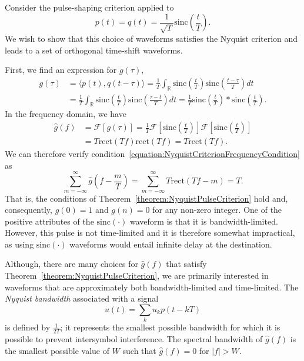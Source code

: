 \begin{example}
Consider the pulse-shaping criterion applied to
\begin{equation*}
p(t) = q(t) = \frac{1}{\sqrt{T}} \mathrm{sinc} \left( \frac{t}{T} \right) .
\end{equation*}
We wish to show that this choice of waveforms satisfies the Nyquist criterion and leads to a set of orthogonal time-shift waveforms.

First, we find an expression for $g(\tau)$,
\begin{equation*}
\begin{split}
g(\tau) &= \langle p(t), q(t-\tau) \rangle
= \frac{1}{T} \int_{\mathbb{R}} \mathrm{sinc} \left( \frac{t}{T} \right)
\mathrm{sinc} \left( \frac{t - \tau}{T} \right) dt \\
&= \frac{1}{T} \int_{\mathbb{R}} \mathrm{sinc} \left( \frac{t}{T} \right)
\mathrm{sinc} \left( \frac{\tau - t}{T} \right) dt
= \frac{1}{T} \mathrm{sinc} \left( \frac{t}{T} \right)
\ast \mathrm{sinc} \left( \frac{t}{T} \right) .
\end{split}
\end{equation*}
In the frequency domain, we have
\begin{equation*}
\begin{split}
\hat{g}(f) &= \mathcal{F} \left[ g(\tau) \right]
= \frac{1}{T} \mathcal{F} \left[ \mathrm{sinc} \left( \frac{t}{T} \right) \right]
\mathcal{F} \left[ \mathrm{sinc} \left( \frac{t}{T} \right) \right] \\
&= T \mathrm{rect} (T f) \mathrm{rect} (T f)
= T \mathrm{rect} (T f) .
\end{split}
\end{equation*}
We can therefore verify condition~\eqref{equation:NyquistCriterionFrequencyCondition} as
\begin{equation*}
\sum_{m = -\infty}^{\infty}
\hat{g} \left( f - \frac{m}{T} \right)
= \sum_{m = - \infty}^{\infty} T \mathrm{rect} (Tf - m)
= T .
\end{equation*}
That is, the conditions of Theorem~\ref{theorem:NyquistPulseCriterion} hold and, consequently, $g(0) = 1$ and $g(n) = 0$ for any non-zero integer.
One of the positive attributes of the $\mathrm{sinc} (\cdot)$ waveform is that it is bandwidth-limited.
However, this pulse is not time-limited and it is therefore somewhat impractical, as using $\mathrm{sinc} (\cdot)$ waveforms would entail infinite delay at the destination.
\end{example}

Although, there are many choices for $\hat{g}(f)$ that satisfy Theorem~\ref{theorem:NyquistPulseCriterion}, we are primarily interested in waveforms that are approximately both bandwidth-limited and time-limited.
The \emph{Nyquist bandwidth} associated with a signal
\begin{equation*}
u(t) = \sum_k u_k p(t -kT)
\end{equation*}
is defined by $\frac{1}{2T}$; it represents the smallest possible bandwidth for which it is possible to prevent intersymbol interference.
The spectral bandwidth of $\hat{g}(f)$ is the smallest possible value of $W$ such that $\hat{g}(f) = 0$ for $|f| > W$.



